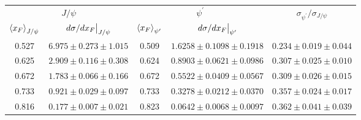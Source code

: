 \begin{tabular}{cc|cc|c}
\hline
\multicolumn{2}{c|}{$J/\psi$}                               & \multicolumn{2}{c|}{$\psi^{\prime}$}                                                    & \multirow{2}{*}{$\sigma_{\psi^\prime}/\sigma_{J/\psi}$} \\ \cline{1-4}
$\expval{x_F}_{J/\psi}$    & $\eval{d\sigma/dx_F}_{J/\psi}$ & $\expval{x_F}_{\psi^\prime}$ & $\eval{d\sigma/dx_F}_{\psi^\prime}$ &                                                         \\ \hline
\multicolumn{1}{c|}{0.527} & $6.975\pm0.273\pm1.015$        & \multicolumn{1}{c|}{0.509}                        & $1.6258\pm0.1098\pm0.1918$          & $0.234\pm0.019\pm0.044$                                 \\
\multicolumn{1}{c|}{0.625} & $2.909\pm0.116\pm0.308$        & \multicolumn{1}{c|}{0.624}                        & $0.8903\pm0.0621\pm0.0986$          & $0.307\pm0.025\pm0.010$                                 \\
\multicolumn{1}{c|}{0.672} & $1.783\pm0.066\pm0.166$        & \multicolumn{1}{c|}{0.672}                        & $0.5522\pm0.0409\pm0.0567$          & $0.309\pm0.026\pm0.015$                                 \\
\multicolumn{1}{c|}{0.733} & $0.921\pm0.029\pm0.097$        & \multicolumn{1}{c|}{0.733}                        & $0.3278\pm0.0212\pm0.0370$          & $0.357\pm0.024\pm0.017$                                 \\
\multicolumn{1}{c|}{0.816} & $0.177\pm0.007\pm0.021$        & \multicolumn{1}{c|}{0.823}                        & $0.0642\pm0.0068\pm0.0097$          & $0.362\pm0.041\pm0.039$                                 \\ \hline
\end{tabular}
